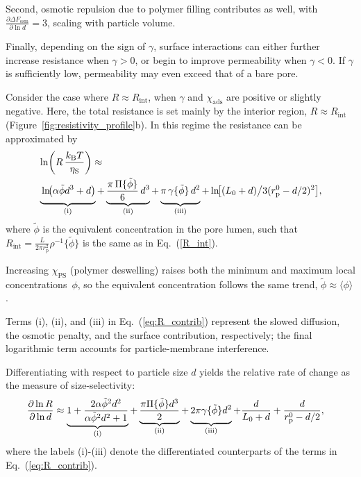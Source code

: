 \documentclass[12pt, a4paper]{article}
\begin{document}
Second, osmotic repulsion due to polymer filling contributes as well, with $\frac{\partial \Delta F_{\text{osm}}}{\partial \ln d} = 3$, scaling with particle volume.

Finally, depending on the sign of $\gamma$, surface interactions can either further increase resistance when $\gamma > 0$, or begin to improve permeability when $\gamma < 0$.
If $\gamma$ is sufficiently low, permeability may even exceed that of a bare pore.

Consider the case where $R \approx R_{\text{int}}$, when $\gamma$ and $\chi_{\text{ads}}$ are positive or slightly negative.
Here, the total resistance is set mainly by the interior region, $R \approx R_{\text{int}}$ (Figure~\ref{fig:resistivity_profile}b).
In this regime the resistance can be approximated by  
\begin{equation}
    \begin{aligned}
        &\ln\!\left(R\,\frac{k_{\text{B}}T}{\eta_{\text{S}}}\right) \approx
        \\
        &\underbrace{\vphantom{\frac{a}{a}}\ln\!\bigl(\alpha\tilde{\phi}d^{3}+d\bigr)}_{\text{(i)}}
        +\underbrace{\frac{\pi\,\Pi\{\tilde{\phi}\}}{6}\,d^{3}}_{\text{(ii)}}
        +\underbrace{\vphantom{\frac{a}{a}}\pi\,\gamma\{\tilde{\phi}\}\,d^{2}}_{\text{(iii)}}
        +\ln\!\bigl[(L_{0}+d)\big/3(r_{\text{p}}^{0}-d/2)^{2}\bigr],
    \end{aligned}
    \label{eq:R_contrib}
\end{equation}
where $\tilde{\phi}$ is the equivalent concentration in the pore lumen, such that $R_{\text{int}} = \frac{L}{2 \pi r_{\text{p}}^2 }\rho^{-1}\{\tilde{\phi}\}$ is the same as in Eq.~(\ref{R_int}).

Increasing $\chi_{\text{PS}}$ (polymer deswelling) raises both the minimum and maximum local concentrations~$\phi$, so the equivalent concentration follows the same trend, $\tilde{\phi}\approx\langle\phi\rangle$.

Terms (i), (ii), and (iii) in Eq.~(\ref{eq:R_contrib}) represent the slowed diffusion, the osmotic penalty, and the surface contribution, respectively; the final logarithmic term accounts for particle-membrane interference.

Differentiating with respect to particle size $d$ yields the relative rate of change as the measure of size-selectivity:
\begin{equation}
    \begin{aligned}
        \frac{\partial\ln R}{\partial\ln d}
        &\approx
        \underbrace{1+\frac{2\alpha\tilde{\phi}^{2}d^{2}}{\alpha\tilde{\phi}^{2}d^{2}+1}}_{\text{(i)}}
        +\underbrace{\frac{\pi\Pi\{\tilde{\phi}\}d^{3}}{2}}_{\text{(ii)}}
        +\underbrace{\vphantom{\frac{a}{a}} 2\pi\gamma\{\tilde{\phi}\}d^{2}}_{\text{(iii)}}
        +\frac{d}{L_{0}+d}+\frac{d}{r_{\text{p}}^{0}-d/2},
    \end{aligned}
    \label{eq:R_contrib_deriv}
\end{equation}
where the labels (i)-(iii) denote the differentiated counterparts of the terms in Eq.~(\ref{eq:R_contrib}).
\end{document}
